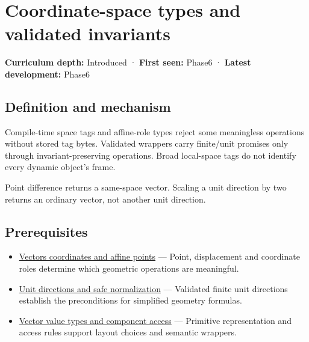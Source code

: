 \hypertarget{appendix-380a220e2529}{}\label{referencestart:appendix-380a220e2529}
\section{Coordinate-space types and validated invariants}\label{appendix-380a220e2529-coordinate-space-types-and-validated-invariants}

\hypertarget{appendix-380a220e2529-coordinate-space-types-and-validated-invariants}{}

\textbf{Curriculum depth:} Introduced · \textbf{First seen:} Phase6 · \textbf{Latest development:} Phase6

\begin{allmightroledefinition}

\subsection{Definition and mechanism}\label{appendix-380a220e2529-definition-and-mechanism}

\hypertarget{appendix-380a220e2529-definition-and-mechanism}{}

Compile-time space tags and affine-role types reject some meaningless operations without stored tag bytes. Validated wrappers carry finite/unit promises only through invariant-preserving operations. Broad local-space tags do not identify every dynamic object's frame.

\end{allmightroledefinition}

Point difference returns a same-space vector. Scaling a unit direction by two returns an ordinary vector, not another unit direction.

\subsection{Prerequisites}\label{appendix-380a220e2529-prerequisites}

\hypertarget{appendix-380a220e2529-prerequisites}{}

\begin{itemize}
\tightlist
\item
  \hyperref[appendix-0659864c0aa3]{Vectors coordinates and affine points} --- Point, displacement and coordinate roles determine which geometric operations are meaningful.
\item
  \hyperref[appendix-f744e41b95b4]{Unit directions and safe normalization} --- Validated finite unit directions establish the preconditions for simplified geometry formulas.
\item
  \hyperref[appendix-37a39984ba66]{Vector value types and component access} --- Primitive representation and access rules support layout choices and semantic wrappers.
\end{itemize}

